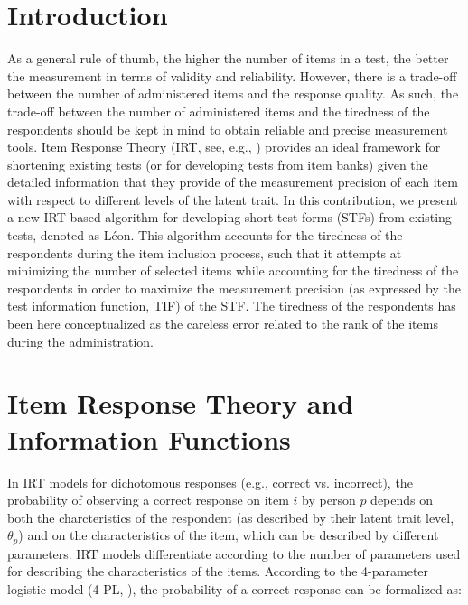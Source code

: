 \documentclass{svproc}
\begin{document}
\section{Introduction}
%
As a general rule of thumb, the higher the number of items in a test, the better the measurement in terms of validity and reliability. However, there is a trade-off between the number of administered items and the response quality. As such, the trade-off between the number of administered items and the tiredness of the respondents should be kept in mind to obtain reliable and precise measurement tools. Item Response Theory (IRT, see, e.g., \cite{baker}) provides an ideal framework for shortening existing tests (or for developing tests from item banks) given the detailed information that they provide of the measurement precision of each item with respect to different levels of the latent trait. 
In this contribution, we present a new IRT-based algorithm for developing short test forms (STFs) from existing tests, denoted as Léon. This algorithm accounts for the tiredness of the respondents during the item inclusion process, such that it attempts at minimizing the number of selected items while accounting for the tiredness  of the respondents in order to maximize the measurement precision (as expressed by the test information function, TIF) of the STF.
\color{red} The tiredness of the respondents has been here conceptualized as the careless error related to the rank of the items during the administration. \normalcolor

\section{Item Response Theory and Information Functions}  

In IRT models for dichotomous responses (e.g., correct vs. incorrect), the probability of observing a correct response on item $i$ by person $p$ depends on both the charcteristics of the respondent (as described by their latent trait level, $\theta_p$) and on the characteristics of the item, which can be described by different parameters. IRT models differentiate according to the number of parameters used for describing the characteristics of the items. According to the 4-parameter logistic model (4-PL, \cite{barton:4pl}), the probability of a correct response can be formalized as: 
\end{document}
